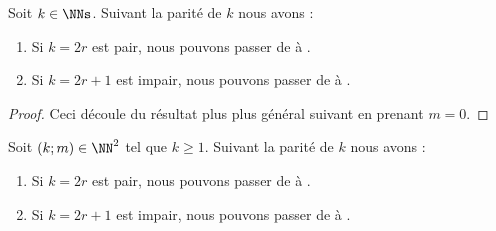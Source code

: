 \begin{fact} \label{kNkB-reduction}
	Soit $k \in \NNs$. Suivant la parité de $k$ nous avons :
	\begin{enumerate}
		\item Si $k = 2r$ est pair, nous pouvons passer de  à  .

		\item Si $k = 2r+1$ est impair, nous pouvons passer de  à  .
	\end{enumerate}
\end{fact}


\begin{proof}
	Ceci découle du résultat plus plus général suivant en prenant $m = 0$.
\end{proof}



\begin{fact}
	Soit $(k ; m) \in \NN^2$ tel que $k \geq 1$. Suivant la parité de $k$ nous avons :
	\begin{enumerate}
		\item Si $k = 2r$ est pair, nous pouvons passer de  à  .

		\item Si $k = 2r+1$ est impair, nous pouvons passer de  à  .
	\end{enumerate}
\end{fact}


